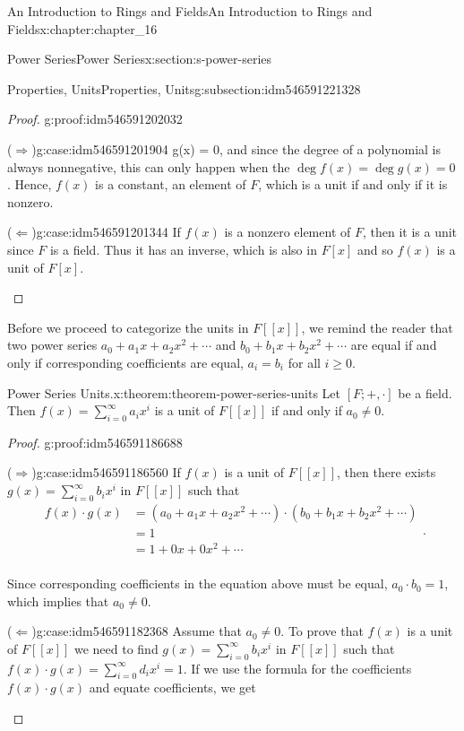 \documentclass[oneside,10pt,]{book}
\newcommand{\forwardimplication}{($\Rightarrow$)}
\newcommand{\backwardimplication}{($\Leftarrow$)}
\numberwithin{equation}{section}
\begin{document}
\begin{chapterptx}{An Introduction to Rings and Fields}{}{An Introduction to Rings and Fields}{}{}{x:chapter:chapter_16}
\begin{sectionptx}{Power Series}{}{Power Series}{}{}{x:section:s-power-series}
\begin{subsectionptx}{Properties, Units}{}{Properties, Units}{}{}{g:subsection:idm546591221328}
\begin{proof}{}{g:proof:idm546591202032}
\begin{case}{\forwardimplication}{}{g:case:idm546591201904}
\deg  g(x) = 0\), and since the degree of a polynomial is always nonnegative, this can only happen when the \(\deg  f(x) = \deg  g(x) = 0\). Hence, \(f(x)\) is a constant, an element of \(F\), which is a unit if and only if it is nonzero.%
\end{case}
\begin{case}{\backwardimplication}{}{g:case:idm546591201344}
If \(f(x)\) is a nonzero element of \(F\), then it is a unit since \(F\) is a field.  Thus it has an inverse, which is also in \(F[x]\) and so \(f(x)\) is a unit of \(F[x]\).%
\end{case}
\end{proof}
Before we proceed to categorize the units in \(F[[x]]\), we remind the reader that two power series \(a_0 + a_1 x+a_2 x^2+ \cdots\) and \(b_0 + b_1
x+b_2 x^2+ \cdots\) are equal if and only if corresponding coefficients are equal, \(a_i=b_i\) for all \(i \geq 0\).%
\begin{theorem}{Power Series Units.}{}{x:theorem:theorem-power-series-units}%
%
%
Let \([F; +, \cdot ]\) be a field. Then \(f(x)=\sum_{i=0}^{\infty } a_i x^i\) is a unit of \(F[[x]]\)  if and only if \(a_0\neq
0\).%
\end{theorem}
\begin{proof}{}{g:proof:idm546591186688}
\begin{case}{\forwardimplication}{}{g:case:idm546591186560}
If \(f(x)\) is a unit of \(F[[x]]\), then there exists  \(g(x)=\sum_{i=0}^{\infty } b_i x^i\) in \(F[[x]]\) such that%
\begin{equation*}
\begin{split}
f(x)\cdot g(x) &=\left(a_0 + a_1 x+a_2 x^2+ \cdots \right)\cdot \left(b_0 + b_1 x+b_2 x^2+ \cdots \right)\\
& =1\\
& = 1 + 0x + 0x^2+ \cdots\\
\end{split}\text{.}
\end{equation*}
%
\par
Since corresponding coefficients in the equation above must be equal, \(a_0\cdot b_0=1\), which implies that \(a_0\neq 0\).%
\end{case}
\begin{case}{\backwardimplication}{}{g:case:idm546591182368}
Assume that \(a_0\neq 0\). To prove that \(f(x)\) is a unit of \(F[[x]]\) we need to find \(g(x)=\sum_{i=0}^{\infty } b_i x^i\) in \(F[[x]]\) such that \(f(x) \cdot  g(x) =\sum_{i=0}^{\infty } d_i x^i= 1\). If we use the formula for the coefficients \(f(x) \cdot g(x)\) and equate coefficients, we get%

\end{case}
\end{proof}
\end{subsectionptx}
\end{sectionptx}
\end{chapterptx}
\end{document}
